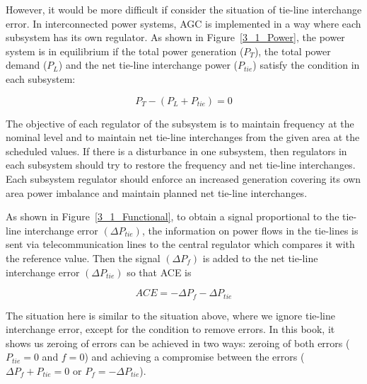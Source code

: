 However, it would be more difficult if consider the situation of tie-line interchange error. In interconnected power systems, AGC is implemented in a way where each subsystem has its own regulator. As shown in Figure~\ref{3_1_Power}, the power system is in equilibrium if the total power generation ($P_T$), the total power demand ($P_L$) and the net tie-line interchange power ($P_{t i e}$) satisfy the condition in each subsystem: 

\begin{equation} \label{eq1}
P_T - (P_L + P_{t i e}) = 0
\end{equation}

The objective of each regulator of the subsystem is to maintain frequency at the nominal level and to maintain net tie-line interchanges from the given area at the scheduled values. If there is a disturbance in one subsystem, then regulators in each subsystem should try to restore the frequency and net tie-line interchanges. Each subsystem regulator should enforce an increased generation covering its own area power imbalance and maintain planned net tie-line interchanges.

As shown in Figure~\ref{3_1_Functional}, to obtain a signal proportional to the tie-line interchange error $(\Delta P_{tie})$, the information on power flows in the tie-lines is sent via telecommunication lines to the central regulator which compares it with the reference value. Then the signal $(\Delta P_f)$ is added to the net tie-line interchange error $(\Delta P_{tie})$ so that ACE is


\begin{equation} \label{eq2}
ACE = - \Delta P_f - \Delta P_{tie}
\end{equation}


The situation here is similar to the situation above, where we ignore tie-line interchange error, except for the condition to remove errors. In this book, it shows us zeroing of errors can be achieved in two ways: zeroing of both errors ($ P_{tie} = 0 $ and $ f = 0 $) and achieving a compromise between the errors ($\Delta P_f + P_{tie} = 0$ or $P_f = - \Delta P_{tie}$). 